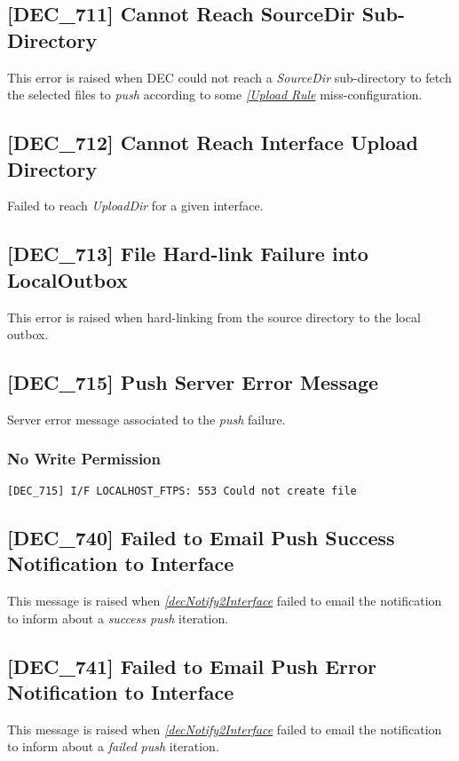 \documentclass[dec_sum_main.tex]{subfiles}
\begin{document}
\label{DEC711}
\subsection{[DEC\_711] Cannot Reach SourceDir Sub-Directory}
This error is raised when DEC could not reach a \textit{SourceDir} sub-directory to fetch the selected files to \textit{push} according to some \hyperref[Upload Rules]{\textit{[Upload Rule}} miss-configuration.

\label{DEC712}
\subsection{[DEC\_712] Cannot Reach Interface Upload Directory}
Failed to reach \textit{UploadDir} for a given interface.

\label{DEC713}
\subsection{[DEC\_713] File Hard-link Failure into LocalOutbox}
This error is raised when hard-linking from the source directory to the local outbox.

\label{DEC715}
\subsection{[DEC\_715] Push Server Error Message}
Server error message associated to the \textit{push} failure. 

\subsubsection{No Write Permission }
\begin{verbatim}
[DEC_715] I/F LOCALHOST_FTPS: 553 Could not create file
\end{verbatim}

\label{DEC740}
\subsection{[DEC\_740] Failed to Email Push Success Notification to Interface}
This message is raised when \hyperref[decNotify2Interface]{\textit{[decNotify2Interface}} failed to email the notification to inform about a \textit{success} \textit{push} iteration.

\label{DEC741}
\subsection{[DEC\_741] Failed to Email Push Error Notification to Interface}
This message is raised when \hyperref[decNotify2Interface]{\textit{[decNotify2Interface}} failed to email the notification to inform about a \textit{failed} \textit{push} iteration.
\end{document}
